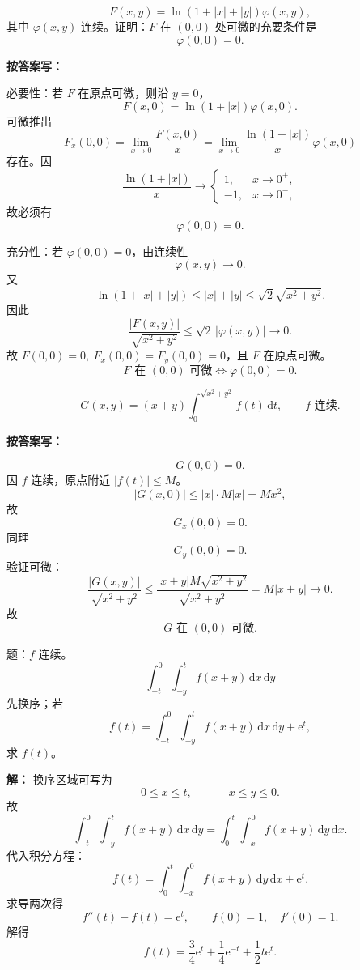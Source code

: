 \documentclass[11pt,a4paper,UTF8]{ctexart}
\newcommand{\dd}{\,\mathrm d}
\newcommand{\ee}{\mathrm e}
\begin{document}
\begin{answerbox}[例：可微充要条件，2024--2025]
\[
F(x,y)=\ln(1+|x|+|y|)\varphi(x,y),
\]
其中 \(\varphi(x,y)\) 连续。证明：\(F\) 在 \((0,0)\) 处可微的充要条件是
\[
\varphi(0,0)=0.
\]

\textbf{按答案写：}

必要性：若 \(F\) 在原点可微，则沿 \(y=0\)，
\[
F(x,0)=\ln(1+|x|)\varphi(x,0).
\]
可微推出
\[
F_x(0,0)=\lim_{x\to0}\frac{F(x,0)}x
=\lim_{x\to0}\frac{\ln(1+|x|)}x\varphi(x,0)
\]
存在。因
\[
\frac{\ln(1+|x|)}x\to
\begin{cases}
1,&x\to0^+,\\
-1,&x\to0^-,
\end{cases}
\]
故必须有
\[
\varphi(0,0)=0.
\]

充分性：若 \(\varphi(0,0)=0\)，由连续性
\[
\varphi(x,y)\to0.
\]
又
\[
\ln(1+|x|+|y|)\le |x|+|y|
\le \sqrt2\sqrt{x^2+y^2}.
\]
因此
\[
\frac{|F(x,y)|}{\sqrt{x^2+y^2}}
\le \sqrt2\,|\varphi(x,y)|\to0.
\]
故 \(F(0,0)=0,\ F_x(0,0)=F_y(0,0)=0\)，且 \(F\) 在原点可微。
\[
\boxed{F\text{ 在 }(0,0)\text{ 可微}\Longleftrightarrow \varphi(0,0)=0.}
\]
\end{answerbox}

\begin{answerbox}[例：2023--2024]
\[
G(x,y)=(x+y)\int_0^{\sqrt{x^2+y^2}}f(t)\dd t,\qquad f\text{ 连续}.
\]

\textbf{按答案写：}

\[
G(0,0)=0.
\]
因 \(f\) 连续，原点附近 \(|f(t)|\le M\)。
\[
|G(x,0)|\le |x|\cdot M|x|=Mx^2,
\]
故
\[
G_x(0,0)=0.
\]
同理
\[
G_y(0,0)=0.
\]
验证可微：
\[
\frac{|G(x,y)|}{\sqrt{x^2+y^2}}
\le
\frac{|x+y|M\sqrt{x^2+y^2}}{\sqrt{x^2+y^2}}
=M|x+y|\to0.
\]
故
\[
\boxed{G\text{ 在 }(0,0)\text{ 可微}.}
\]
\end{answerbox}

\newpage

\begin{answerbox}[2022--2023 大题：换序与积分方程]
题：\(f\) 连续。
\[
\int_{-t}^{0}\int_{-y}^{t}f(x+y)\dd x\dd y
\]
先换序；若
\[
f(t)=\int_{-t}^{0}\int_{-y}^{t}f(x+y)\dd x\dd y+\ee^t,
\]
求 \(f(t)\)。

\textbf{解：}
换序区域可写为
\[
0\le x\le t,\qquad -x\le y\le0.
\]
故
\[
\int_{-t}^{0}\int_{-y}^{t}f(x+y)\dd x\dd y
=\int_0^t\int_{-x}^{0}f(x+y)\dd y\dd x.
\]
代入积分方程：
\[
f(t)=\int_0^t\int_{-x}^{0}f(x+y)\dd y\dd x+\ee^t.
\]
求导两次得
\[
f''(t)-f(t)=\ee^t,\qquad f(0)=1,\quad f'(0)=1.
\]
解得
\[
\boxed{f(t)=\frac34\ee^t+\frac14\ee^{-t}+\frac12t\ee^t}.
\]
\end{answerbox}
\end{document}
